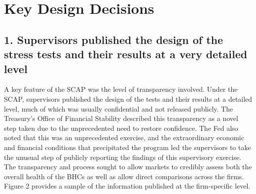 \documentclass[justified, nobib]{tufte-handout2}
\begin{document}
\section{Key Design Decisions}

\subsection{1. Supervisors published the design of the stress tests and
their results at a very detailed
level}

A key feature of the SCAP was the level of transparency involved. Under
the SCAP, supervisors published the design of the tests and their
results at a detailed level, much of which was usually confidential and
not released publicly. The Treasury's Office of Financial Stability
described this transparency as a novel step taken due to the
unprecedented need to restore confidence. The Fed also noted that this
was an unprecedented exercise, and the extraordinary economic and
financial conditions that precipitated the program led the supervisors
to take the unusual step of publicly reporting the findings of this
supervisory exercise. The transparency and process sought to allow
markets to credibly assess both the overall health of the BHCs as well
as allow direct comparisons across the firms. Figure 2 provides a sample
of the information published at the firm-specific level.
\end{document}

